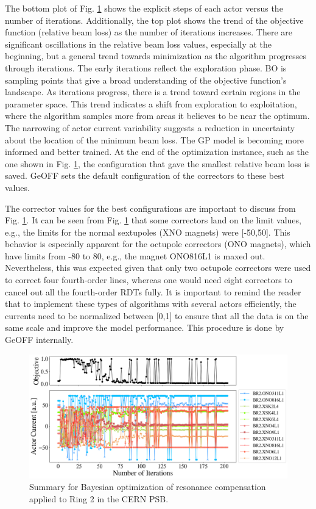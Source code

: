 The bottom plot of Fig. \ref{fig:bo1} shows the explicit steps of each actor versus the number of iterations. Additionally, the top plot shows the trend of the objective function (relative beam loss) as the number of iterations increases. There are significant oscillations in the relative beam loss values, especially at the beginning, but a general trend towards minimization as the algorithm progresses through iterations. The early iterations reflect the exploration phase. BO is sampling points that give a broad understanding of the objective function's landscape. As iterations progress, there is a trend toward certain regions in the parameter space. This trend indicates a shift from exploration to exploitation, where the algorithm samples more from areas it believes to be near the optimum. The narrowing of actor current variability suggests a reduction in uncertainty about the location of the minimum beam loss. The GP model is becoming more informed and better trained. At the end of the optimization instance, such as the one shown in Fig. \ref{fig:bo1}, the configuration that gave the smallest relative beam loss is saved. GeOFF sets the default configuration of the correctors to these best values. 

The corrector values for the best configurations are important to discuss from Fig. \ref{fig:bo1}. It can be seen from Fig. \ref{fig:bo1} that some correctors land on the limit values, e.g., the limits for the normal sextupoles (XNO magnets) were [-50,50]. This behavior is especially apparent for the octupole correctors (ONO magnets), which have limits from -80 to 80, e.g., the magnet ONO816L1 is maxed out. Nevertheless, this was expected given that only two octupole correctors were used to correct four fourth-order lines, whereas one would need eight correctors to cancel out all the fourth-order RDTs fully. It is important to remind the reader that to implement these types of algorithms with several actors efficiently, the currents need to be normalized between [0,1] to ensure that all the data is on the same scale and improve the model performance. This procedure is done by GeOFF internally.    

\begin{figure}[H]
    \centering
    \includegraphics[width=\linewidth]{chapter5/2023_05_02_R2_LHCramp_BayesOpt.png}
    \caption{Summary for Bayesian optimization of resonance compensation applied to Ring 2 in the CERN PSB.}
    \label{fig:bo1}
   \vspace{-1.25em}
\end{figure}

